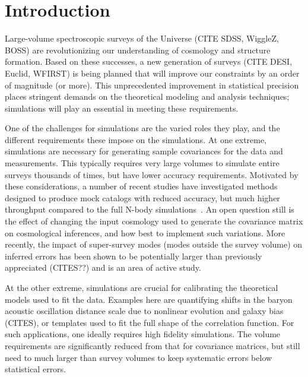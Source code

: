 \section{Introduction}

Large-volume spectroscopic surveys of the Universe (CITE SDSS, WiggleZ, BOSS)
are revolutionizing our understanding of cosmology and structure formation.
Based on these successes, a new generation of surveys (CITE DESI, Euclid, 
WFIRST) is being planned that will improve our constraints by an order
of magnitude (or more). This unprecedented improvement in statistical 
precision places stringent demands on the theoretical modeling and 
analysis techniques; simulations will play an essential in meeting these 
requirements. 

One of the challenges for simulations are the varied roles they play, 
and the different requirements these impose on the simulations. 
At one extreme, simulations are necessary for generating sample covariances 
for the data and measurements. This typically requires very large 
volumes to simulate entire surveys thousands of times, but have lower accuracy 
requirements. 
Motivated
by these considerations, a number of recent studies have investigated
methods designed to produce mock catalogs with reduced accuracy, but
much higher throughput compared to the full N-body
simulations~\cite{2002ApJ...564....8M,2002MNRAS.331..587M,2008MNRAS.391..435F,
2013AN....334..691R,2013arXiv1312.2013C,2013JCAP...06..036T,2014MNRAS.437.2594W,
2013MNRAS.433.2389M,2001A&A...367...18H,2009ApJ...701..945S,2014MNRAS.439L..21K,2014arXiv1409.1124C}.
An open question still is the effect of changing the input cosmology used
to generate the covariance matrix on cosmological inferences, and how 
best to implement such variations. More recently, the impact of super-survey
modes (modes outside the survey volume) on inferred errors has 
been shown to be potentially larger than previously appreciated (CITES??) 
and is an area of active study.

At the other extreme, simulations are crucial for calibrating the theoretical
models used to fit the data. Examples here are quantifying shifts in the
baryon acoustic oscillation distance scale due to nonlinear evolution
and galaxy bias (CITES), or templates used to fit the full shape of the 
correlation function. For such applications, one ideally requires 
high fidelity simulations. The volume requirements are significantly 
reduced from that for covariance matrices, but still need to much larger
than survey volumes to keep systematic errors below statistical errors.

